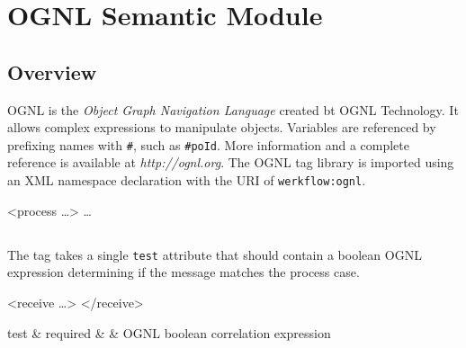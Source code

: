 \chapter{OGNL Semantic Module}

\section{Overview}

OGNL is the \emph{Object Graph Navigation Language}
created bt OGNL Technology.  It allows complex expressions to
manipulate objects.  Variables are referenced by prefixing
names with \verb|#|, such as \verb|#poId|.  More information
and a complete reference is available at \emph{http://ognl.org}.
The OGNL tag library is imported using an XML namespace
declaration with the URI of \verb|werkflow:ognl|.

\begin{codelisting}
<process  \dots>
    \dots
\end{codelisting}


\section{}

The  tag takes a single \verb|test| attribute
that should contain a boolean OGNL expression determining if
the message matches the process case.

\begin{codelisting}
<receive \dots>
</receive>
\end{codelisting}

\begin{attrDefs}
test		&	required	&			& OGNL boolean correlation expression \\
\end{attrDefs}
